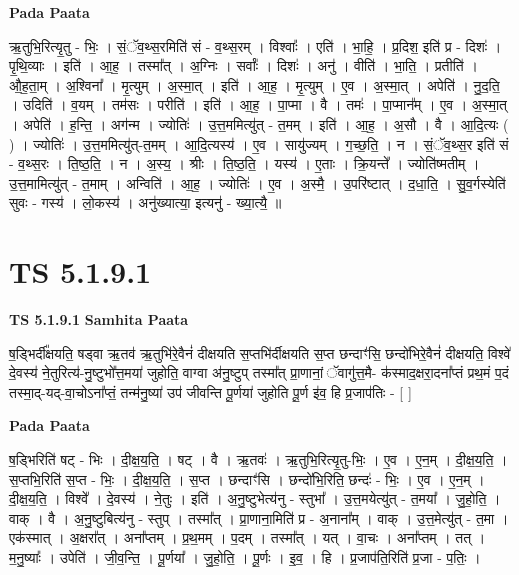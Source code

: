 \documentclass[17pt]{extarticle}
\begin{document}
\textbf{Pada Paata} \newline

ऋ॒तुभि॒रित्यृ॒तु - भिः॒ । सं॒ॅव॒थ्स॒रमिति॑ सं - व॒थ्स॒रम् । विश्वाः᳚ । एति॑ । भा॒हि॒ । प्र॒दिश॒ इति॑ प्र - दिशः॑ । पृ॒थि॒व्याः । इति॑ । आ॒ह॒ । तस्मा᳚त् । अ॒ग्निः । सर्वाः᳚ । दिशः॑ । अनु॑ । वीति॑ । भा॒ति॒ । प्रतीति॑ । औ॒ह॒ता॒म् । अ॒श्विना᳚ । मृ॒त्युम् । अ॒स्मा॒त् । इति॑ । आ॒ह॒ । मृ॒त्युम् । ए॒व । अ॒स्मा॒त् । अपेति॑ । नु॒द॒ति॒ । उदिति॑ । व॒यम् । तम॑सः । परीति॑ । इति॑ । आ॒ह॒ । पा॒प्मा । वै । तमः॑ । पा॒प्मान᳚म् । ए॒व । अ॒स्मा॒त् । अपेति॑ । ह॒न्ति॒ । अग॑न्म । ज्योतिः॑ । उ॒त्त॒ममित्यु॑त् - त॒मम् । इति॑ । आ॒ह॒ । अ॒सौ । वै । आ॒दि॒त्यः ( ) । ज्योतिः॑ । उ॒त्त॒ममित्यु॑त्-त॒मम् । आ॒दि॒त्यस्य॑ । ए॒व । सायु॑ज्यम् । ग॒च्छ॒ति॒ । न । सं॒ॅव॒थ्स॒र इति॑ सं - व॒थ्स॒रः । ति॒ष्ठ॒ति॒ । न । अ॒स्य॒ । श्रीः । ति॒ष्ठ॒ति॒ । यस्य॑ । ए॒ताः । क्रि॒यन्ते᳚ । ज्योति॑ष्मतीम् । उ॒त्त॒मामित्यु॑त् - त॒माम् । अन्विति॑ । आ॒ह॒ । ज्योतिः॑ । ए॒व । अ॒स्मै॒ । उ॒परि॑ष्टात् । द॒धा॒ति॒ । सु॒व॒र्गस्येति॑ सुवः - गस्य॑ । लो॒कस्य॑ । अनु॑ख्यात्या॒ इत्यनु॑ - ख्या॒त्यै॒ ॥  \newline





\section{ TS 5.1.9.1 }

\textbf{TS 5.1.9.1 } \newline
\textbf{Samhita Paata} \newline

ष॒ड्भिर्दी᳚क्षयति॒ षड्वा ऋ॒तव॑ ऋ॒तुभि॑रे॒वैनं॑ दीक्षयति स॒प्तभि॑र्दीक्षयति स॒प्त छन्दाꣳ॑सि॒ छन्दो॑भिरे॒वैनं॑ दीक्षयति॒ विश्वे॑ दे॒वस्य॑ ने॒तुरित्य॑-नु॒ष्टुभो᳚त्त॒मया॑ जुहोति॒ वाग्वा अ॑नु॒ष्टुप् तस्मा᳚त् प्रा॒णानां॒ ॅवागु॑त्त॒मै- क॑स्माद॒क्षरा॒दना᳚प्तं प्रथ॒मं प॒दं तस्मा॒द्-यद्-वा॒चोऽना᳚प्तं॒ तन्म॑नु॒ष्या॑ उप॑ जीवन्ति पू॒र्णया॑ जुहोति पू॒र्ण इ॑व॒ हि प्र॒जाप॑तिः - [  ] \newline

\textbf{Pada Paata} \newline

ष॒ड्भिरिति॑ षट् - भिः । दी॒क्ष॒य॒ति॒ । षट् । वै । ऋ॒तवः॑ । ऋ॒तुभि॒रित्यृ॒तु-भिः॒ । ए॒व । ए॒न॒म् । दी॒क्ष॒य॒ति॒ । स॒प्तभि॒रिति॑ स॒प्त - भिः॒ । दी॒क्ष॒य॒ति॒ । स॒प्त । छन्दाꣳ॑सि । छन्दो॑भि॒रिति॒ छन्दः॑ - भिः॒ । ए॒व । ए॒न॒म् । दी॒क्ष॒य॒ति॒ । विश्वे᳚ । दे॒वस्य॑ । ने॒तुः । इति॑ । अ॒नु॒ष्टुभेत्य॑नु - स्तुभा᳚ । उ॒त्त॒मयेत्यु॑त् - त॒मया᳚ । जु॒हो॒ति॒ । वाक् । वै । अ॒नु॒ष्टुबित्य॑नु - स्तुप् । तस्मा᳚त् । प्रा॒णाना॒मिति॑ प्र - अ॒नाना᳚म् । वाक् । उ॒त्त॒मेत्यु॑त् - त॒मा । एक॑स्मात् । अ॒क्षरा᳚त् । अना᳚प्तम् । प्र॒थ॒मम् । प॒दम् । तस्मा᳚त् । यत् । वा॒चः । अना᳚प्तम् । तत् । म॒नु॒ष्याः᳚ । उपेति॑ । जी॒व॒न्ति॒ । पू॒र्णया᳚ । जु॒हो॒ति॒ । पू॒र्णः । इ॒व॒ । हि । प्र॒जाप॑ति॒रिति॑ प्र॒जा - प॒तिः॒ ।  \newline
\end{document}
